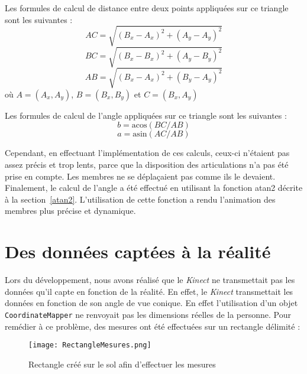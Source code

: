 Les formules de calcul de distance entre deux points appliquées sur ce triangle sont les suivantes : \\
\begin{equation}
AC = \sqrt{(B_x - A_x)^2 + (A_y - A_y)^2}
\end{equation}
\begin{equation}
BC = \sqrt{(B_x - B_x)^2 + (A_y - B_y)^2} 
\end{equation}
\begin{equation}
AB = \sqrt{(B_x - A_x)^2 + (B_y - A_y)^2} 
\end{equation}
où $A=(A_x,A_y)$, $B=(B_x,B_y)$ et $C=(B_x,A_y)$

Les formules de calcul de l'angle appliquées sur ce triangle sont les suivantes : \\
\begin{equation}
b = \mathrm{acos}{(BC/AB)}
\end{equation}
\begin{equation}
a = \mathrm{asin}{(AC/AB)}
\end{equation}

Cependant, en effectuant l'implémentation de ces calculs, ceux-ci n'étaient pas assez précis et trop lents, parce que la disposition des articulations n'a pas été prise en compte. Les membres ne se déplaçaient pas comme ils le devaient. Finalement, le calcul de l'angle a été effectué en utilisant la fonction atan2 décrite à la section~\ref{atan2}. L'utilisation de cette fonction a rendu l'animation des membres plus précise et dynamique.

\pagebreak
\section*{Des données captées à la réalité}  \label{probRealite}
Lors du développement, nous avons réalisé que le \textit{Kinect} ne transmettait pas les données qu'il capte en fonction de la réalité. En effet, le \textit{Kinect} transmettait les données en fonction de son angle de vue conique. En effet l'utilisation d'un objet \texttt{CoordinateMapper} ne renvoyait pas les dimensions réelles de la personne. Pour remédier à ce problème, des mesures ont été effectuées sur un rectangle délimité :
\begin{figure}[H]
	\centering
		\texttt{[image: RectangleMesures.png]}
	\caption{\label{rectangleMesures} Rectangle créé sur le sol afin d'effectuer les mesures}
\end{figure}

